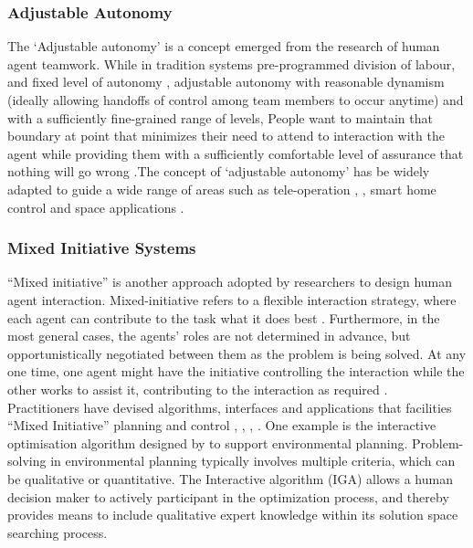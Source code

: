 \subsubsection{Adjustable Autonomy}
The `Adjustable  autonomy' is a concept emerged from the research of human agent teamwork. While in tradition systems pre-programmed division of labour, and fixed level of autonomy , adjustable autonomy with reasonable dynamism (ideally allowing handoffs of control among team members to occur anytime) and with a sufficiently fine-grained range of levels, People want to maintain that boundary at point that minimizes their need to attend to interaction with the agent while providing them with a sufficiently comfortable level of assurance that nothing will go wrong \cite{Bradshaw2003}.The concept of `adjustable autonomy' has be widely adapted to guide a wide range of areas such as tele-operation \cite{Schwarz2014}, \cite{Goodrich2001a}, smart home control \cite{Costanza2014} and space applications \cite{Doraisa}. \\

\subsubsection{Mixed Initiative Systems}
``Mixed initiative'' is another approach adopted by researchers to design human agent interaction.  Mixed-initiative refers to a flexible interaction strategy, where each agent can contribute to the task what it does best \cite{Allen1999}. Furthermore, in the most general cases, the agents' roles are not determined in advance, but opportunistically negotiated between them as the problem is being solved. At any one time, one agent might have the initiative controlling the interaction while the other works to assist it, contributing to the interaction as required \cite{Horvitz1999}.\\

Practitioners have devised algorithms, interfaces and applications that facilities ``Mixed Initiative'' planning and control \cite{Ferguson1996}, \cite{Burstein2003}, \cite{Hardin2009}, \cite{Zimmerman2007} . One example is the interactive optimisation algorithm designed by \cite{Yang2012} to support environmental planning. Problem-solving in environmental planning typically involves multiple criteria, which can be qualitative or quantitative. The Interactive algorithm (IGA) allows a human decision maker to actively
participant in the optimization process, and thereby provides means to include qualitative expert knowledge within its solution space searching process.\\





